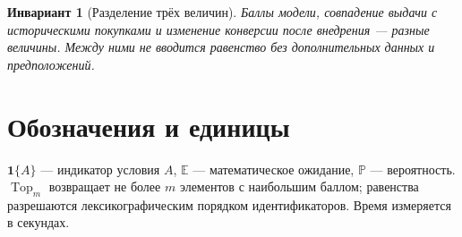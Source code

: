 \documentclass[12pt,a4paper]{article}
\newcommand{\E}{\mathbb E}
\newcommand{\Prob}{\mathbb P}
\newcommand{\ind}{\mathbf 1}
\DeclareMathOperator{\Top}{Top}
\theoremstyle{plainru}
\newtheorem{invariant}{Инвариант}[section]
\begin{document}
\begin{invariant}[Разделение трёх величин]
Баллы модели, совпадение выдачи с историческими покупками и изменение
конверсии после внедрения --- разные величины. Между ними не вводится
равенство без дополнительных данных и предположений.
\end{invariant}

\section{Обозначения и единицы}\label{sec:symbols}

\(\ind\{A\}\) --- индикатор условия \(A\), \(\E\) --- математическое
ожидание, \(\Prob\) --- вероятность. \(\Top_m\) возвращает не более
\(m\) элементов с наибольшим баллом; равенства разрешаются
лексикографическим порядком идентификаторов. Время измеряется в секундах.
\end{document}
